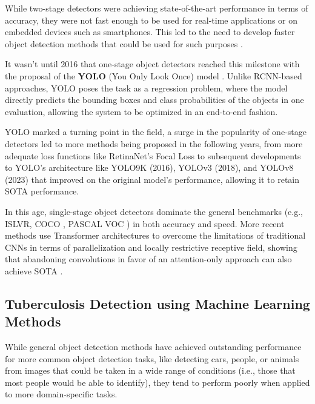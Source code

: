 \documentclass[../main.tex]{subfiles}
\begin{document}
    While two-stage detectors were achieving state-of-the-art performance in terms of accuracy, they were not fast enough to be used for real-time applications or on embedded devices such as smartphones. This led to the need to develop faster object detection methods that could be used for such purposes \cite{zouObjectDetection202023b}.
    
    It wasn't until 2016 that one-stage object detectors reached this milestone with the proposal of the \textbf{YOLO} (You Only Look Once) model \cite{redmonYouOnlyLook2016}. Unlike RCNN-based approaches, YOLO poses the task as a regression problem, where the model directly predicts the bounding boxes and class probabilities of the objects in one evaluation, allowing the system to be optimized in an end-to-end fashion. 

     YOLO marked a turning point in the field, a surge in the popularity of one-stage detectors led to more methods being proposed in the following years, from more adequate loss functions like RetinaNet's Focal Loss \cite{linFocalLossDense2018} to subsequent developments to YOLO's architecture like YOLO9K (2016), YOLOv3 (2018), and YOLOv8 (2023) \cite{redmonYOLO9000BetterFaster2016, redmonYOLOv3IncrementalImprovement2018, Jocher_YOLO_by_Ultralytics_2023} that improved on the original model's performance, allowing it to retain SOTA performance.
     
     In this age, single-stage object detectors dominate the general benchmarks (e.g., ISLVR, COCO \cite{linMicrosoftCOCOCommon2015}, PASCAL VOC \cite{everinghamPascalVisualObject2010}) in both accuracy and speed. More recent methods use Transformer architectures \cite{vaswaniAttentionAllYou2017} to overcome the limitations of traditional CNNs in terms of parallelization and locally restrictive receptive field, showing that abandoning convolutions in favor of an attention-only approach can also achieve SOTA \cite{ carionEndtoEndObjectDetection2020,zhuDeformableDETRDeformable2021}.
    
    \subsection{Tuberculosis Detection using Machine Learning Methods} \label{sec:ml_tuberculosis_detection} 

    While general object detection methods have achieved outstanding performance for more common object detection tasks, like detecting cars, people, or animals from images 
    that could be taken in a wide range of conditions (i.e., those that most people would be able to identify), they tend to perform poorly when applied to more domain-specific tasks.
    
\end{document}
